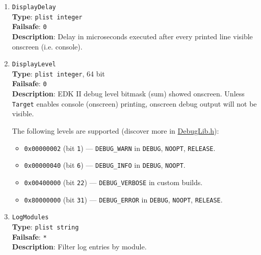 \documentclass[]{article}
\providecommand{\tightlist}{%
  \setlength{\itemsep}{0pt}\setlength{\parskip}{0pt}}
\begin{document}
\begin{enumerate}
\item
  \texttt{DisplayDelay}\\
  \textbf{Type}: \texttt{plist\ integer}\\
  \textbf{Failsafe}: \texttt{0}\\
  \textbf{Description}: Delay in microseconds executed after
  every printed line visible onscreen (i.e. console).

\item
  \texttt{DisplayLevel}\\
  \textbf{Type}: \texttt{plist\ integer}, 64 bit\\
  \textbf{Failsafe}: \texttt{0}\\
  \textbf{Description}: EDK II debug level bitmask (sum) showed onscreen.
  Unless \texttt{Target} enables console (onscreen) printing,
  onscreen debug output will not be visible.

  The following levels are supported (discover more in
  \href{https://github.com/acidanthera/audk/blob/master/MdePkg/Include/Library/DebugLib.h}{DebugLib.h}):

  \begin{itemize}
  \tightlist
    \item \texttt{0x00000002} (bit \texttt{1}) --- \texttt{DEBUG\_WARN} in \texttt{DEBUG},
      \texttt{NOOPT}, \texttt{RELEASE}.
    \item \texttt{0x00000040} (bit \texttt{6}) --- \texttt{DEBUG\_INFO} in \texttt{DEBUG},
      \texttt{NOOPT}.
    \item \texttt{0x00400000} (bit \texttt{22}) --- \texttt{DEBUG\_VERBOSE} in custom builds.
    \item \texttt{0x80000000} (bit \texttt{31}) --- \texttt{DEBUG\_ERROR} in \texttt{DEBUG},
      \texttt{NOOPT}, \texttt{RELEASE}.
  \end{itemize}

\item
  \texttt{LogModules}\\
  \textbf{Type}: \texttt{plist\ string}\\
  \textbf{Failsafe}: \texttt{*}\\
  \textbf{Description}: Filter log entries by module.


\end{enumerate}
\end{document}
